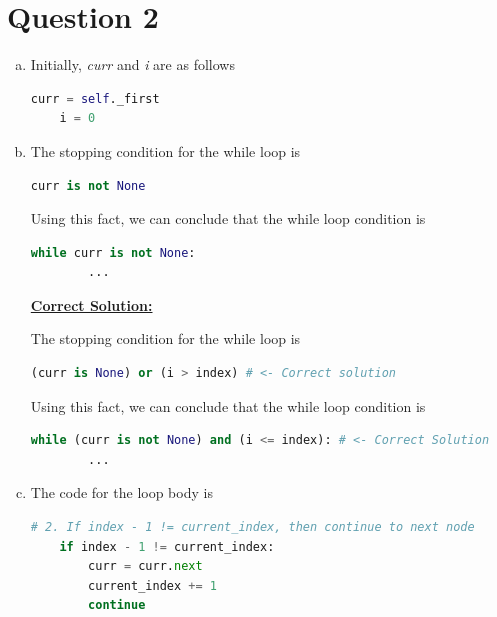 \documentclass[12pt]{article}
\begin{document}
\section*{Question 2}
\begin{enumerate}[a.]
    \item

    Initially, \textit{curr} and \textit{i} are as follows

    \begin{lstlisting}[language=Python]
    curr = self._first
    i = 0
    \end{lstlisting}

    \item

    The stopping condition for the while loop is

    \begin{lstlisting}[language=Python]
    curr is not None
    \end{lstlisting}

    \bigskip

    Using this fact, we can conclude that the while loop condition is

    \begin{lstlisting}[language=Python]
    while curr is not None:
        ...
    \end{lstlisting}

    \bigskip

    \begin{mdframed}
    \underline{\textbf{Correct Solution:}}

    \bigskip

    The stopping condition for the while loop is

    \begin{lstlisting}[language=Python]
    (curr is None) or (i > index) # <- Correct solution
    \end{lstlisting}

    \bigskip

    Using this fact, we can conclude that the while loop condition is

    \begin{lstlisting}[language=Python]
    while (curr is not None) and (i <= index): # <- Correct Solution
        ...
    \end{lstlisting}
    \end{mdframed}

    \item
    The code for the loop body is
    \begin{lstlisting}[language=Python]
    # 2. If index - 1 != current_index, then continue to next node
    if index - 1 != current_index:
        curr = curr.next
        current_index += 1
        continue


\end{lstlisting}
\end{enumerate}
\end{document}
